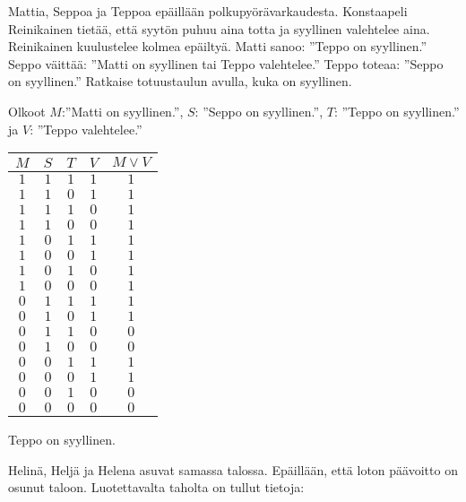 \begin{kotitehtavasivu}
\begin{tehtava}
\end{tehtava}

\begin{tehtava}
     Mattia, Seppoa ja Teppoa epäillään polkupyörävarkaudesta. Konstaapeli Reinikainen tietää, että syytön puhuu aina totta ja syyllinen valehtelee aina. Reinikainen kuulustelee kolmea epäiltyä. Matti sanoo: ''Teppo on syyllinen.'' Seppo väittää: ''Matti on syyllinen tai Teppo valehtelee.'' Teppo toteaa: ''Seppo on syyllinen.'' Ratkaise totuustaulun avulla, kuka on syyllinen. 
    \begin{vastaus}
      Olkoot $M$:''Matti on syyllinen.'', $S$: ''Seppo on syyllinen.'', $T$: ''Teppo on syyllinen.'' ja $V$: ''Teppo valehtelee.''
      \begin{center}
		    \begin{tabular}{|c|c|c|c|c|}\hline
		    $M$ & $S$ & $T$ & $V$ & $M\lor V$ \\ \hline
		    $1$ & $1$ & $1$ & $1$ & $1$ \\ %
		    $1$ & $1$ & $0$ & $1$ & $1$ \\
		    $1$ & $1$ & $1$ & $0$ & $1$ \\
		    $1$ & $1$ & $0$ & $0$ & $1$ \\
		    $1$ & $0$ & $1$ & $1$ & $1$ \\
		    $1$ & $0$ & $0$ & $1$ & $1$ \\
		    $1$ & $0$ & $1$ & $0$ & $1$ \\
		    $1$ & $0$ & $0$ & $0$ & $1$ \\
		    $0$ & $1$ & $1$ & $1$ & $1$ \\
		    $0$ & $1$ & $0$ & $1$ & $1$ \\
		    $0$ & $1$ & $1$ & $0$ & $0$ \\
		    $0$ & $1$ & $0$ & $0$ & $0$ \\
		    $0$ & $0$ & $1$ & $1$ & $1$ \\
		    $0$ & $0$ & $0$ & $1$ & $1$ \\
		    $0$ & $0$ & $1$ & $0$ & $0$ \\
		    $0$ & $0$ & $0$ & $0$ & $0$ \\ \hline
\end{tabular}
\end{center}
Teppo on syyllinen. %
    \end{vastaus}
    
\end{tehtava}

\begin{tehtava}
     Helinä, Heljä ja Helena asuvat samassa talossa. Epäillään, että loton päävoitto on osunut taloon. Luotettavalta taholta on tullut tietoja:


\end{tehtava}
\end{kotitehtavasivu}
